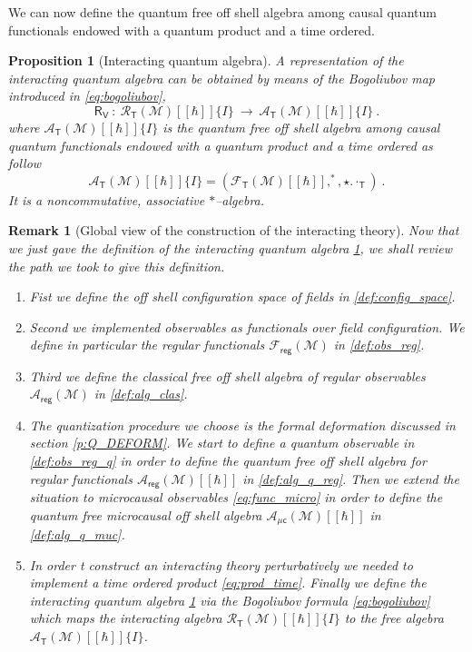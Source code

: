 \documentclass[11pt]{book}
\newcommand{\reg}{\mathsf{reg}}
\newcommand{\muc}{\mu\csf}
\newcommand{\Acal}{\mathcal{A}}
\newcommand{\Fcal}{\mathcal{F}}
\newcommand{\Mcal}{\mathcal{M}}
\newcommand{\Rcal}{\mathcal{R}}
\newcommand{\Rsf}{\mathsf{R}}
\newcommand{\Tsf}{\mathsf{T}}
\newcommand{\Vsf}{\mathsf{V}}
\newcommand{\csf}{\mathsf{c}}
\theoremstyle{break}
\newtheorem{proposition}{Proposition}[chapter]
\newtheorem{remark}{Remark}[chapter]
\begin{document}
\bigskip


We can now define the quantum free off shell algebra among causal quantum functionals endowed with a quantum product and a time ordered. 


\begin{proposition}[Interacting quantum algebra]\label{prop:alg_int}
A representation of the interacting quantum algebra can be obtained by means of the Bogoliubov map introduced in \eqref{eq:bogoliubov},
%
\begin{equation}
\Rsf_\Vsf \ : \ \Rcal_\Tsf(\Mcal)[[\hbar]]\{I\} \ \to \ \Acal_\Tsf(\Mcal)[[\hbar]]\{I\} \ .
\label{eq:alg_int}
\end{equation}
\index{$\Rcal_\Tsf(\Mcal)[[\hbar]]\{I\}$}
%
where $\Acal_\Tsf(\Mcal)[[\hbar]]\{I\}$ is the quantum free off shell algebra among causal quantum functionals endowed with a quantum product and a time ordered as follow
%
\begin{equation*}
\Acal_\Tsf(\Mcal)[[\hbar]]\{I\} = \left(\Fcal_\Tsf(\Mcal)[[\hbar]] , ^\ast , \star . \cdot_\Tsf \right) \ . 
\end{equation*}
%
It is a noncommutative, associative $\ast$--algebra.
\end{proposition}



\begin{remark}[Global view of the construction of the interacting theory]
Now that we just gave the definition of the interacting quantum algebra \ref{prop:alg_int}, we shall review the path we took to give this definition.
%
\begin{enumerate}
\item Fist we define the off shell configuration space of fields in \ref{def:config_space}.
%
\item Second we implemented observables as functionals over field configuration. We define in particular the regular functionals $\Fcal_\reg(\Mcal)$ in \ref{def:obs_reg}.
%
\item Third we define the classical free off shell algebra of regular observables $\Acal_\reg(\Mcal)$ in \ref{def:alg_clas}.
%
\item The quantization procedure we choose is the formal deformation discussed in section \ref{p:Q_DEFORM}. We start to define a quantum observable in \ref{def:obs_reg_q} in order to define the quantum free off shell algebra for regular functionals $\Acal_\reg(\Mcal)[[\hbar]]$ in \ref{def:alg_q_reg}. Then we extend the situation to microcausal observables \eqref{eq:func_micro} in order to define the quantum free microcausal off shell algebra $\Acal_{\muc}(\Mcal)[[\hbar]]$ in \ref{def:alg_q_muc}.
%
\item In order t construct an interacting theory perturbatively we needed to implement a time ordered product \eqref{eq:prod_time}. Finally we define the interacting quantum algebra \ref{prop:alg_int} via the Bogoliubov formula \eqref{eq:bogoliubov} which maps the interacting algebra $\Rcal_\Tsf(\Mcal)[[\hbar]]\{I\}$ to the free algebra $\Acal_\Tsf(\Mcal)[[\hbar]]\{I\} $.
%
\end{enumerate}
\end{remark}
\end{document}
